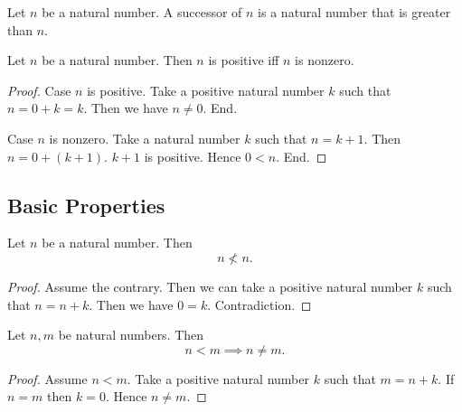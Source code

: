 \documentclass[10pt]{article}
\begin{document}
  \begin{forthel}
    \begin{definition}[id=ARITHMETIC_04_8147686326796288,printid]
      Let $n$ be a natural number.
      A successor of $n$ is a natural number that is greater than $n$.
    \end{definition}
  \end{forthel}

  \begin{forthel}
    \begin{proposition}[id=ARITHMETIC_04_4826285599621120,printid]
      Let $n$ be a natural number.
      Then $n$ is positive iff $n$ is nonzero.
    \end{proposition}
    \begin{proof}
      Case $n$ is positive.
        Take a positive natural number $k$ such that $n = 0 + k = k$.
        Then we have $n \neq 0$.
      End.

      Case $n$ is nonzero.
        Take a natural number $k$ such that $n = k + 1$.
        Then $n = 0 + (k + 1)$.
        $k + 1$ is positive.
        Hence $0 < n$.
      End.
    \end{proof}
  \end{forthel}


  \subsection*{Basic Properties}

  \begin{forthel}
    \begin{proposition}[id=ARITHMETIC_04_1037693395927040,printid]
      Let $n$ be a natural number.
      Then \[ n \nless n. \]
    \end{proposition}
    \begin{proof}
      Assume the contrary.
      Then we can take a positive natural number $k$ such that $n = n + k$.
      Then we have $0 = k$.
      Contradiction.
    \end{proof}
  \end{forthel}

  \begin{forthel}
    \begin{proposition}[id=ARITHMETIC_04_8266284905005056,printid]
      Let $n, m$ be natural numbers.
      Then \[ n < m \implies n \neq m. \]
    \end{proposition}
    \begin{proof}
      Assume $n < m$.
      Take a positive natural number $k$ such that $m = n + k$.
      If $n = m$ then $k = 0$.
      Hence $n \neq m$.
    \end{proof}
  \end{forthel}
\end{document}
